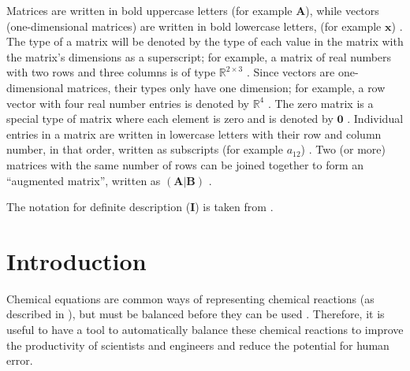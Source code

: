 \documentclass[12pt]{article}
\newcommand*{\defDesc}{\mathbf{I}}
\begin{document}
Matrices are written in bold uppercase letters (for example $\textbf{A}$),
while vectors (one-dimensional matrices) are written in bold lowercase letters,
(for example
$\textbf{x}$) \cite{osullivan_appendix_2010}. The type of a matrix will be
denoted by the type of each value in the matrix with the matrix's dimensions
as a superscript; for example, a matrix of real numbers with two rows and
three columns is of type $\mathbb{R}^{2 \times 3}$
\cite[p.~3]{golub_matrix_2013}. Since vectors are one-dimensional
matrices, their types only have one dimension; for example, a row vector with
four real number entries is denoted by $\mathbb{R}^{4}$
\cite[p.~4]{golub_matrix_2013}. The zero matrix is a special
type of matrix where each element is zero and is denoted by $\textbf{0}$
\cite{weisstein_zero_2023}.
Individual entries in a matrix are written in
lowercase letters with their row and column number, in that order, written as
subscripts (for example $a_{12}$) \cite{osullivan_appendix_2010}.
Two (or more) matrices with the same
number of rows can be joined together to form an ``augmented matrix'', written
as $\left(\textbf{A}\vert \textbf{B}\right)$ \cite{taboga_augmented_2021}.

The notation for definite description ($\defDesc$) is taken from
\cite{farmer_simple_2023}.


\newpage



\section{Introduction} \label{sec_intro}
Chemical equations are common ways of representing chemical reactions (as
described in ), but must be balanced before they can
be used \cite{lund_introduction_2023}. Therefore, it is useful to have a
tool to automatically balance these chemical reactions to improve the
productivity of scientists and engineers and reduce the potential for human
error.
\end{document}
